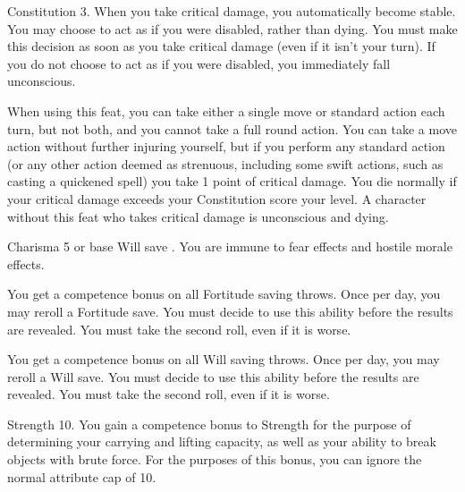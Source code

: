  Constitution 3.
 When you take critical damage, you automatically become stable. You may choose to act as if you were disabled, rather than dying. You must make this decision as soon as you take critical damage (even if it isn't your turn). If you do not choose to act as if you were disabled, you immediately fall unconscious.
\par When using this feat, you can take either a single move or standard action each turn, but not both, and you cannot take a full round action. You can take a move action without further injuring yourself, but if you perform any standard action (or any other action deemed as strenuous, including some swift actions, such as casting a quickened spell) you take 1 point of critical damage. You die normally if your critical damage exceeds your Constitution score \add your level.
 A character without this feat who takes critical damage is unconscious and dying.

\featpre Charisma 5 or base Will save .
\featben You are immune to fear effects and hostile morale effects.

 You get a  competence bonus on all Fortitude saving throws. Once per day, you may reroll a Fortitude save. You must decide to use this ability before the results are revealed. You must take the second roll, even if it is worse.


 You get a  competence bonus on all Will saving throws. Once per day, you may reroll a Will save. You must decide to use this ability before the results are revealed. You must take the second roll, even if it is worse.

\featpre Strength 10.
\featben You gain a  competence bonus to Strength for the purpose of determining your carrying and lifting capacity, as well as your ability to break objects with brute force. For the purposes of this bonus, you can ignore the normal attribute cap of 10.


